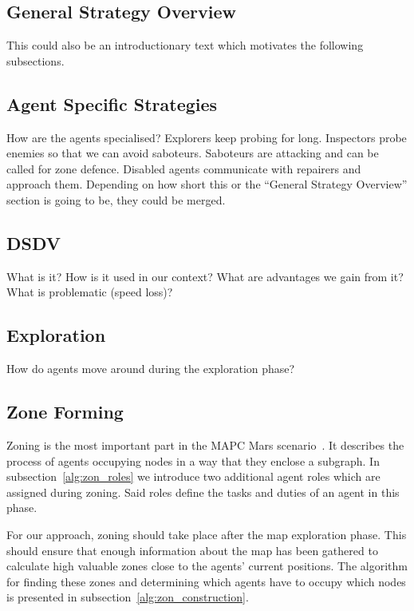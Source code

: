 \subsection{General Strategy Overview}
This could also be an introductionary text which motivates the following subsections.

\subsection{Agent Specific Strategies}
How are the agents specialised? Explorers keep probing for long. Inspectors probe enemies so that we can avoid saboteurs. Saboteurs are attacking and can be called for zone defence. Disabled agents communicate with repairers and approach them. Depending on how short this or the ``General Strategy Overview'' section is going to be, they could be merged.

\subsection{DSDV}
What is it? How is it used in our context? What are advantages we gain from it? What is problematic (speed loss)?

\subsection{Exploration}\label{alg:exploration}
How do agents move around during the exploration phase?

\subsection{Zone Forming}
Zoning is the most important part in the MAPC Mars scenario~\cite{ahlbrecht_mapc_2014}.%
It describes the process of agents occupying nodes in a way that they enclose a subgraph. In subsection~\ref{alg:zon_roles} we introduce two additional agent roles which are assigned during zoning. Said roles define the tasks and duties of an agent in this phase.

For our approach, zoning should take place after the map exploration phase. This should ensure that enough information about the map has been gathered to calculate high valuable zones close to the agents' current positions. The algorithm for finding these zones and determining which agents have to occupy which nodes is presented in subsection~\ref{alg:zon_construction}.

